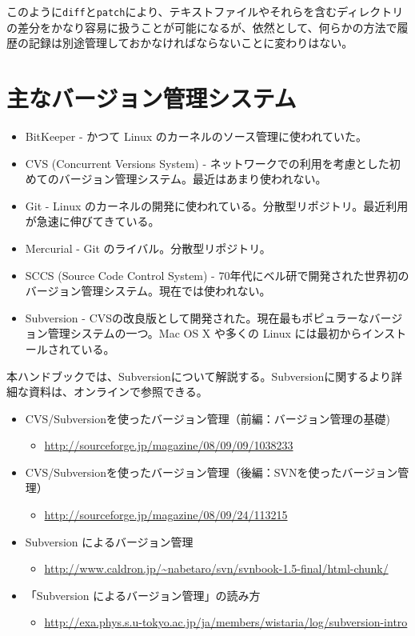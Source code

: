 このように{\tt diff}と{\tt patch}により、テキストファイルやそれらを含むディレクトリの差分をかなり容易に扱うことが可能になるが、依然として、何らかの方法で履歴の記録は別途管理しておかなければならないことに変わりはない。

\section{主なバージョン管理システム}

\begin{itemize}
\item BitKeeper - かつて Linux のカーネルのソース管理に使われていた。
\item CVS (Concurrent Versions System) - ネットワークでの利用を考慮とした初めてのバージョン管理システム。最近はあまり使われない。
\item Git - Linux のカーネルの開発に使われている。分散型リポジトリ。最近利用が急速に伸びてきている。
\item Mercurial - Git のライバル。分散型リポジトリ。
\item SCCS (Source Code Control System) - 70年代にベル研で開発された世界初のバージョン管理システム。現在では使われない。
\item Subversion - CVSの改良版として開発された。現在最もポピュラーなバージョン管理システムの一つ。Mac OS X や多くの Linux には最初からインストールされている。
\end{itemize}
本ハンドブックでは、Subversionについて解説する。Subversionに関するより詳細な資料は、オンラインで参照できる。
\begin{itemize}
\item CVS/Subversionを使ったバージョン管理（前編：バージョン管理の基礎)
  \begin{itemize}
  \item \url{http://sourceforge.jp/magazine/08/09/09/1038233}
  \end{itemize}
\item CVS/Subversionを使ったバージョン管理（後編：SVNを使ったバージョン管理）
  \begin{itemize}
  \item \url{http://sourceforge.jp/magazine/08/09/24/113215}
  \end{itemize}
\item Subversion によるバージョン管理
  \begin{itemize}
  \item \url{http://www.caldron.jp/~nabetaro/svn/svnbook-1.5-final/html-chunk/}
  \end{itemize}
\item 「Subversion によるバージョン管理」の読み方
  \begin{itemize}
  \item \url{http://exa.phys.s.u-tokyo.ac.jp/ja/members/wistaria/log/subversion-intro}
  \end{itemize}
\end{itemize}
